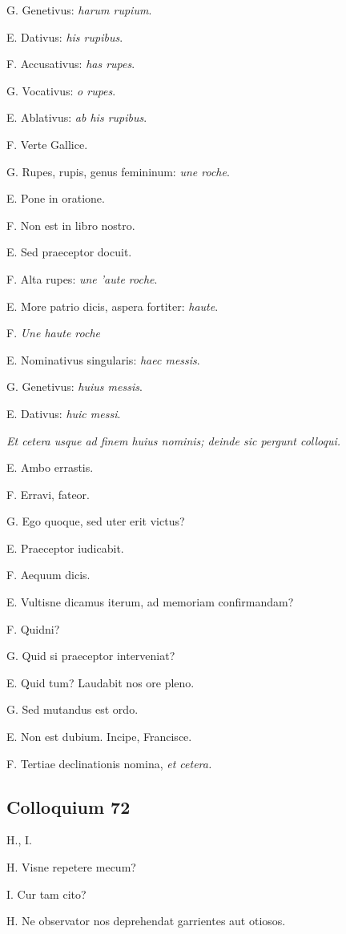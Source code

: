 \documentclass{article}
\newcommand{\fr}[1]{\foreignlanguage{french}{\emph{#1}}}
\begin{document}
G. Genetivus: \emph{harum rupium}.

E. Dativus: \emph{his rupibus}.

F. Accusativus: \emph{has rupes}.

G. Vocativus: \emph{o rupes}.

E. Ablativus: \emph{ab his rupibus}.

F. Verte Gallice.

G. Rupes, rupis, genus femininum: \fr{une roche}.

E. Pone in oratione.

F. Non est in libro nostro.

E. Sed praeceptor docuit.

F. Alta rupes: \fr{une 'aute roche}.

E. More patrio dicis, aspera fortiter: \fr{haute}.

F. \fr{Une haute roche}

E. Nominativus singularis: \emph{haec messis}.

G. Genetivus: \emph{huius messis}.

E. Dativus: \emph{huic messi}.

\emph{Et cetera usque ad finem huius nominis; deinde sic pergunt colloqui.}

E. Ambo errastis.

F. Erravi, fateor.

G. Ego quoque, sed uter erit victus?

E. Praeceptor iudicabit.

F. Aequum dicis.

E. Vultisne dicamus iterum, ad memoriam confirmandam?

F. Quidni?

G. Quid si praeceptor interveniat?

E. Quid tum? Laudabit nos ore pleno.

G. Sed mutandus est ordo.

E. Non est dubium. Incipe, Francisce.

F. Tertiae declinationis nomina, \emph{et cetera.}

\subsection{Colloquium 72}
H., I.

H. Visne repetere mecum?

I. Cur tam cito?

H. Ne observator nos deprehendat garrientes aut otiosos.
\end{document}

